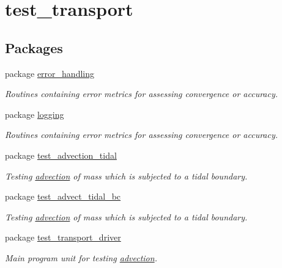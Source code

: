 \hypertarget{a00099}{
\section{test\_\-transport}
\label{a00099}
}
\subsection*{Packages}
\begin{CompactItemize}
\item 
package \hyperlink{a00059}{error\_\-handling}
\begin{CompactList}\small\item\em Routines containing error metrics for assessing convergence or accuracy. \item\end{CompactList}

\item 
package \hyperlink{a00069}{logging}
\begin{CompactList}\small\item\em Routines containing error metrics for assessing convergence or accuracy. \item\end{CompactList}

\item 
package \hyperlink{a00077}{test\_\-advection\_\-tidal}
\begin{CompactList}\small\item\em Testing \hyperlink{a00054}{advection} of mass which is subjected to a tidal boundary. \item\end{CompactList}

\item 
package \hyperlink{a00076}{test\_\-advect\_\-tidal\_\-bc}
\begin{CompactList}\small\item\em Testing \hyperlink{a00054}{advection} of mass which is subjected to a tidal boundary. \item\end{CompactList}

\item 
package \hyperlink{a00097}{test\_\-transport\_\-driver}
\begin{CompactList}\small\item\em Main program unit for testing \hyperlink{a00054}{advection}. \item\end{CompactList}


\end{CompactItemize}
